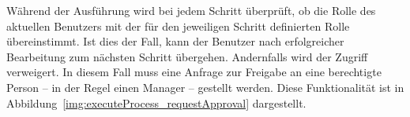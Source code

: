 Während der Ausführung wird bei jedem Schritt überprüft, ob die Rolle des aktuellen Benutzers mit der für den jeweiligen Schritt definierten Rolle übereinstimmt. Ist dies der Fall, kann der Benutzer nach erfolgreicher Bearbeitung zum nächsten Schritt übergehen. Andernfalls wird der Zugriff verweigert. In diesem Fall muss eine Anfrage zur Freigabe an eine berechtigte Person – in der Regel einen Manager – gestellt werden. Diese Funktionalität ist in Abbildung~\ref{img:executeProcess_requestApproval} dargestellt.




